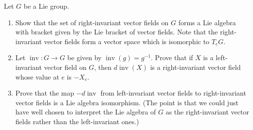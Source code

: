 \documentclass[12pt]{memoir}
\DeclareMathOperator{\inv}{inv}
\begin{document}

\begin{Ej}
    Let $G$ be a Lie group. 
	\begin{enumerate}
		\item Show that the set of right-invariant vector fields on $G$ forms a Lie algebra with bracket given by the Lie bracket of vector fields. Note that the right-invariant vector fields form a vector space which is isomorphic to $T_eG$.
		
		\item Let $\inv: G \to G$ be given by $\inv(g) = g^{-1}$. Prove that if $X$ is a left-invariant vector field on $G$, then $d\inv(X)$ is a right-invariant vector field whose value at $e$ is $-X_e$.
		
		\item Prove that the map $-d\inv$ from left-invariant vector fields to right-invariant vector fields is a Lie algebra isomorphism. (The point is that we could just have well chosen to interpret the Lie algebra of $G$ as the right-invariant vector fields rather than the left-invariant ones.)
	\end{enumerate}
\end{Ej}




\end{document}
